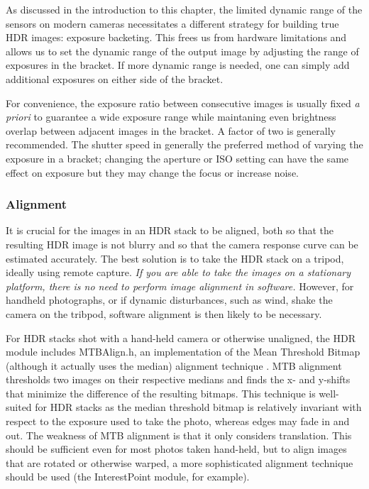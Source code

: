 As discussed in the introduction to this chapter, the limited dynamic
range of the sensors on modern cameras necessitates a different
strategy for building true HDR images: exposure backeting.  This frees
us from hardware limitations and allows us to set the dynamic range of
the output image by adjusting the range of exposures in the bracket.
If more dynamic range is needed, one can simply add additional
exposures on either side of the bracket.

For convenience, the exposure ratio between consecutive images is
usually fixed {\em a priori} to guarantee a wide exposure range while
maintaning even brightness overlap between adjacent images in the
bracket. A factor of two is generally recommended.  The shutter speed
in generally the preferred method of varying the exposure in a
bracket; changing the aperture or ISO setting can have the same effect
on exposure but they may change the focus or increase noise.

\subsubsection{Alignment}
It is crucial for the images in an HDR stack to be aligned, both so
that the resulting HDR image is not blurry and so that the camera
response curve can be estimated accurately.  The best solution is to
take the HDR stack on a tripod, ideally using remote capture.  {\em If
  you are able to take the images on a stationary platform, there is
  no need to perform image alignment in software.}  However, for
handheld photographs, or if dynamic disturbances, such as wind, shake
the camera on the tribpod, software alignment is then likely to be
necessary.

For HDR stacks shot with a hand-held camera or otherwise unaligned,
the HDR module includes MTBAlign.h, an implementation of the Mean
Threshold Bitmap (although it actually uses the median) alignment
technique \cite{hdrbook}. MTB alignment thresholds two images on their
respective medians and finds the x- and y-shifts that minimize the
difference of the resulting bitmaps. This technique is well-suited for
HDR stacks as the median threshold bitmap is relatively invariant with
respect to the exposure used to take the photo, whereas edges may fade
in and out. The weakness of MTB alignment is that it only considers
translation. This should be sufficient even for most photos taken
hand-held, but to align images that are rotated or otherwise warped, a
more sophisticated alignment technique should be used (the
InterestPoint module, for example).

